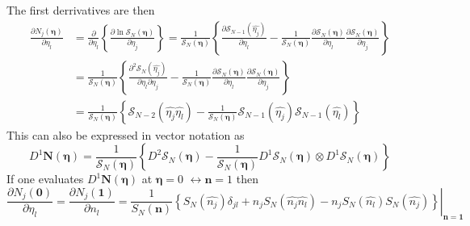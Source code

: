 \documentclass[aps,preprint]{revtex4}%
\begin{document}
The first derrivatives are then
\begin{align}
\frac{\partial N_{j}\left(  \mathbf{\eta}\right)  }{\partial\eta_{l}} &
=\frac{\partial}{\partial\eta_{l}}\left\{  \frac{\partial\ln\mathcal{S}%
_{N}\left(  \mathbf{\eta}\right)  }{\partial\eta_{j}}\right\}  =\frac
{1}{\mathcal{S}_{N}\left(  \mathbf{\eta}\right)  }\left\{  \frac
{\partial\mathcal{S}_{N-1}\left(  \widehat{\eta_{j}}\right)  }{\partial
\eta_{l}}-\frac{1}{\mathcal{S}_{N}\left(  \mathbf{\eta}\right)  }%
\frac{\partial\mathcal{S}_{N}\left(  \mathbf{\eta}\right)  }{\partial\eta_{l}%
}\frac{\partial\mathcal{S}_{N}\left(  \mathbf{\eta}\right)  }{\partial\eta
_{j}}\right\}  \nonumber\\
&  =\frac{1}{\mathcal{S}_{N}\left(  \mathbf{\eta}\right)  }\left\{
\frac{\partial^{2}\mathcal{S}_{N}\left(  \widehat{\eta_{j}}\right)  }%
{\partial\eta_{l}\partial\eta_{j}}-\frac{1}{\mathcal{S}_{N}\left(
\mathbf{\eta}\right)  }\frac{\partial\mathcal{S}_{N}\left(  \mathbf{\eta
}\right)  }{\partial\eta_{l}}\frac{\partial\mathcal{S}_{N}\left(
\mathbf{\eta}\right)  }{\partial\eta_{j}}\right\}  \nonumber\\
&  =\frac{1}{\mathcal{S}_{N}\left(  \mathbf{\eta}\right)  }\left\{
\mathcal{S}_{N-2}\left(  \widehat{\eta_{j}}\widehat{\eta_{l}}\right)
-\frac{1}{\mathcal{S}_{N}\left(  \mathbf{\eta}\right)  }\mathcal{S}%
_{N-1}\left(  \widehat{\eta_{j}}\right)  \mathcal{S}_{N-1}\left(
\widehat{\eta_{l}}\right)  \right\}
\end{align}
This can also be expressed in vector notation as
\begin{equation}
D^{1}\mathbf{N}\left(  \mathbf{\eta}\right)  =\frac{1}{\mathcal{S}_{N}\left(
\mathbf{\eta}\right)  }\left\{  D^{2}\mathcal{S}_{N}\left(  \mathbf{\eta
}\right)  -\frac{1}{\mathcal{S}_{N}\left(  \mathbf{\eta}\right)  }%
D^{1}\mathcal{S}_{N}\left(  \mathbf{\eta}\right)  \otimes D^{1}\mathcal{S}%
_{N}\left(  \mathbf{\eta}\right)  \right\}
\end{equation}
If one evaluates $D^{1}\mathbf{N}\left(  \mathbf{\eta}\right)  $ at
$\mathbf{\eta}=0$ $\leftrightarrow\mathbf{n}=1$ then
\begin{equation}
\frac{\partial N_{j}\left(  \mathbf{0}\right)  }{\partial\eta_{l}}%
=\frac{\partial N_{j}\left(  \mathbf{1}\right)  }{\partial n_{l}}=\left.
\frac{1}{S_{N}\left(  \mathbf{n}\right)  }\left\{  S_{N}\left(  \widehat
{n_{j}}\right)  \delta_{jl}+n_{j}S_{N}\left(  \widehat{n_{j}}\widehat{n_{l}%
}\right)  -n_{j}S_{N}\left(  \widehat{n_{l}}\right)  S_{N}\left(
\widehat{n_{j}}\right)  \right\}  \right\vert _{\mathbf{n=1}}%
\end{equation}
\end{document}
